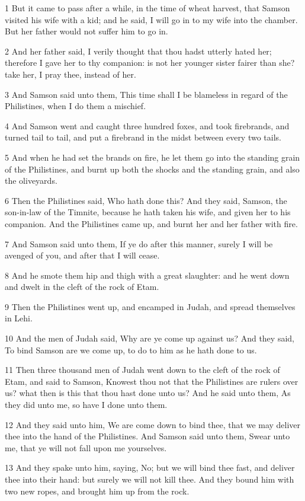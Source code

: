 \par 1 But it came to pass after a while, in the time of wheat harvest, that Samson visited his wife with a kid; and he said, I will go in to my wife into the chamber. But her father would not suffer him to go in.
\par 2 And her father said, I verily thought that thou hadst utterly hated her; therefore I gave her to thy companion: is not her younger sister fairer than she? take her, I pray thee, instead of her.
\par 3 And Samson said unto them, This time shall I be blameless in regard of the Philistines, when I do them a mischief.
\par 4 And Samson went and caught three hundred foxes, and took firebrands, and turned tail to tail, and put a firebrand in the midst between every two tails.
\par 5 And when he had set the brands on fire, he let them go into the standing grain of the Philistines, and burnt up both the shocks and the standing grain, and also the oliveyards.
\par 6 Then the Philistines said, Who hath done this? And they said, Samson, the son-in-law of the Timnite, because he hath taken his wife, and given her to his companion. And the Philistines came up, and burnt her and her father with fire.
\par 7 And Samson said unto them, If ye do after this manner, surely I will be avenged of you, and after that I will cease.
\par 8 And he smote them hip and thigh with a great slaughter: and he went down and dwelt in the cleft of the rock of Etam.
\par 9 Then the Philistines went up, and encamped in Judah, and spread themselves in Lehi.
\par 10 And the men of Judah said, Why are ye come up against us? And they said, To bind Samson are we come up, to do to him as he hath done to us.
\par 11 Then three thousand men of Judah went down to the cleft of the rock of Etam, and said to Samson, Knowest thou not that the Philistines are rulers over us? what then is this that thou hast done unto us? And he said unto them, As they did unto me, so have I done unto them.
\par 12 And they said unto him, We are come down to bind thee, that we may deliver thee into the hand of the Philistines. And Samson said unto them, Swear unto me, that ye will not fall upon me yourselves.
\par 13 And they spake unto him, saying, No; but we will bind thee fast, and deliver thee into their hand: but surely we will not kill thee. And they bound him with two new ropes, and brought him up from the rock.
